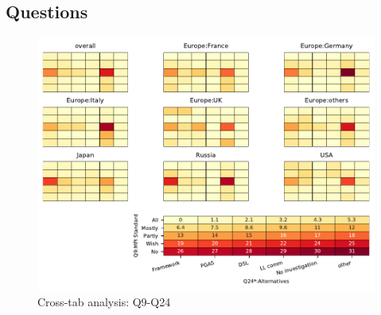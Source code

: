 
\subsection{Questions}


\begin{figure}
\begin{center}
\includegraphics[width=12cm]{../pdfs/Q9-Q24.pdf}
\caption{Cross-tab analysis: Q9-Q24}
\label{fig:Q9-Q24}
\end{center}
\end{figure}
